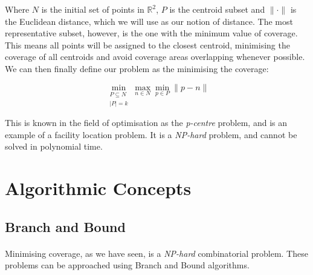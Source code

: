 \noindent
Where $N$ is the initial set of points in $\mathbb{R}^2$, $P$ is the centroid subset and $\lVert \cdot \rVert $ is the Euclidean distance, which we will use as our notion of distance.
The most representative subset, however, is the one with the minimum value of coverage. This means all points will be assigned to the closest centroid, minimising the coverage of all centroids and avoid coverage areas overlapping whenever possible.
We can then finally define our problem as the minimising the coverage:

\begin{equation}
\min_{\substack{P \subseteq N\\ \lvert P \rvert = k}}{\max_{n \in N}{\min_{p \in P}{\lVert p-n \rVert}}}
\end{equation}

\noindent
This is known in the field of optimisation as the \textit{p-centre} problem, and is an example of a facility location problem. It is a \textit{NP-hard} problem, and cannot be solved in polynomial time.

\section{Algorithmic Concepts}
\subsection{Branch and Bound}
\paragraph{}
Minimising coverage, as we have seen, is a \textit{NP-hard} combinatorial problem. These problems can be approached using Branch and Bound algorithms.
